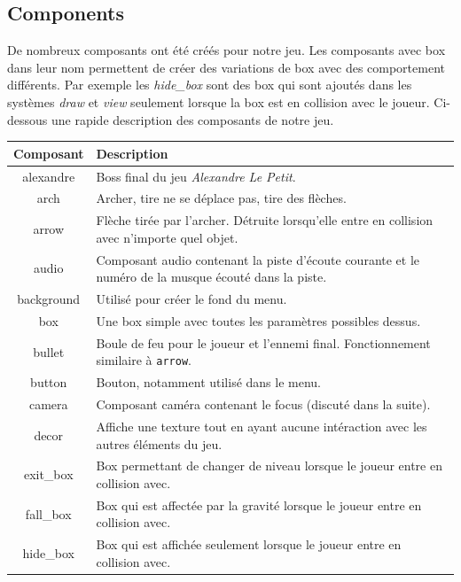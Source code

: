 \documentclass{article}
\begin{document}
\subsection{Components}
De nombreux composants ont été créés pour notre jeu. Les composants avec box dans leur nom permettent de créer des 
variations de box avec des comportement différents. Par exemple les \textit{hide\_box} sont des box qui sont 
ajoutés dans les systèmes \textit{draw} et \textit{view} seulement lorsque la box est en collision avec le joueur.
Ci-dessous une rapide description des composants de notre jeu.
\begin{center}
    \begin{tabular}[h]{ |c|p{10cm}| }
        \hline
        \textbf{Composant} & \textbf{Description} \\
        \hline
        alexandre & Boss final du jeu \textit{Alexandre Le Petit}. \\
        \hline
        arch & Archer, tire ne se déplace pas, tire des flèches. \\
        \hline
        arrow & Flèche tirée par l'archer. Détruite lorsqu'elle entre en collision avec n'importe quel objet. \\
        \hline
        audio & Composant audio contenant la piste d'écoute courante et le numéro de la musque écouté dans la 
        piste. \\
        \hline
        background & Utilisé pour créer le fond du menu. \\
        \hline
        box & Une box simple avec toutes les paramètres possibles dessus. \\
        \hline
        bullet & Boule de feu pour le joueur et l'ennemi final. Fonctionnement similaire à \verb|arrow|. \\
        \hline
        button & Bouton, notamment utilisé dans le menu. \\
        \hline
        camera & Composant caméra contenant le focus (discuté dans la suite). \\
        \hline
        decor & Affiche une texture tout en ayant aucune intéraction avec les autres éléments du jeu. \\
        \hline
        exit\_box & Box permettant de changer de niveau lorsque le joueur entre en collision avec. \\
        \hline
        fall\_box & Box qui est affectée par la gravité lorsque le joueur entre en collision avec. \\
        \hline
        hide\_box & Box qui est affichée seulement lorsque le joueur entre en collision avec. \\

\end{tabular}
\end{center}
\end{document}
